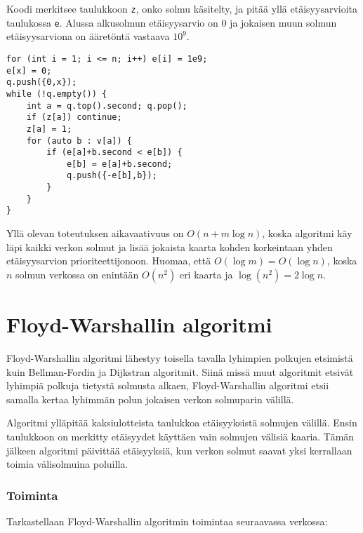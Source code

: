 Koodi merkitsee taulukkoon \texttt{z},
onko solmu käsitelty,
ja pitää yllä etäisyysarvioita taulukossa \texttt{e}.
Alussa alkusolmun etäisyysarvio on 0
ja jokaisen muun solmun etäisyysarviona
on ääretöntä vastaava $10^9$.

\begin{lstlisting}
for (int i = 1; i <= n; i++) e[i] = 1e9;
e[x] = 0;
q.push({0,x});
while (!q.empty()) {
    int a = q.top().second; q.pop();
    if (z[a]) continue;
    z[a] = 1;
    for (auto b : v[a]) {
        if (e[a]+b.second < e[b]) {
            e[b] = e[a]+b.second;
            q.push({-e[b],b});
        }
    }
}
\end{lstlisting}

Yllä olevan toteutuksen aikavaativuus on $O(n+m \log n)$,
koska algoritmi käy läpi kaikki verkon solmut
ja lisää jokaista kaarta kohden korkeintaan
yhden etäisyysarvion prioriteettijonoon.
Huomaa, että $O(\log m)=O(\log n)$, koska 
$n$ solmun verkossa on enintään $O(n^2)$ eri kaarta
ja $\log(n^2) = 2 \log n$.

\section{Floyd-Warshallin algoritmi}

Floyd-Warshallin algoritmi lähestyy toisella
tavalla lyhimpien polkujen etsimistä
kuin Bellman-Fordin ja Dijkstran algoritmit.
Siinä missä muut algoritmit
etsivät lyhimpiä polkuja
tietystä solmusta alkaen,
Floyd-Warshallin algoritmi etsii
samalla kertaa lyhimmän polun jokaisen verkon
solmuparin välillä.

Algoritmi ylläpitää kaksiulotteista
taulukkoa etäisyyksistä solmujen
välillä.
Ensin taulukkoon on merkitty
etäisyydet käyttäen vain solmujen
välisiä kaaria.
Tämän jälkeen algoritmi
päivittää etäisyyksiä,
kun verkon solmut saavat yksi kerrallaan
toimia välisolmuina poluilla.

\subsubsection{Toiminta}

Tarkastellaan Floyd-Warshallin
algoritmin toimintaa seuraavassa verkossa:

\begin{center}
\end{center}

